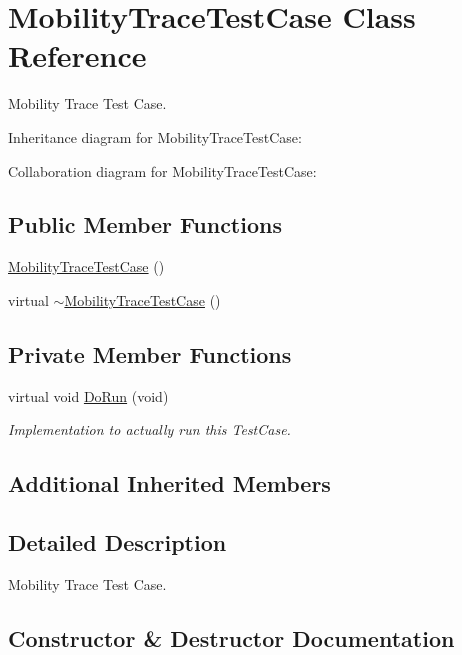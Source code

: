 \hypertarget{classMobilityTraceTestCase}{}\section{Mobility\+Trace\+Test\+Case Class Reference}
\label{classMobilityTraceTestCase}


Mobility Trace Test Case.  




Inheritance diagram for Mobility\+Trace\+Test\+Case\+:


Collaboration diagram for Mobility\+Trace\+Test\+Case\+:
\subsection*{Public Member Functions}
\begin{DoxyCompactItemize}
\item 
\hyperlink{classMobilityTraceTestCase_ada161090a806935627aff148d5698ea1}{Mobility\+Trace\+Test\+Case} ()
\item 
virtual \hyperlink{classMobilityTraceTestCase_a1d00ea0fa73fbefbfe260000f6c2cfe9}{$\sim$\+Mobility\+Trace\+Test\+Case} ()
\end{DoxyCompactItemize}
\subsection*{Private Member Functions}
\begin{DoxyCompactItemize}
\item 
virtual void \hyperlink{classMobilityTraceTestCase_ae30ac31273ee7b04d922588517c14ca8}{Do\+Run} (void)
\begin{DoxyCompactList}\small\item\em Implementation to actually run this Test\+Case. \end{DoxyCompactList}\end{DoxyCompactItemize}
\subsection*{Additional Inherited Members}


\subsection{Detailed Description}
Mobility Trace Test Case. 

\subsection{Constructor \& Destructor Documentation}
